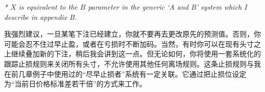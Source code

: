 \smallskip \noindent\textit{* \(X\) is equivalent to the \(B\) parameter in the generic ‘A and B’ system which I describe in appendix B.}

\begin{chinesetableblock} \begingroup \small \setlength{\tabcolsep}{2pt} \renewcommand{\arraystretch}{1.15}
\noindent{}
\endgroup \end{chinesetableblock}

\begin{chineseblock}我强烈建议，一旦某笔下注已经建立，你就不要再去更改原先的预测值。否则，你可能会忍不住过早止盈，或者在亏损时不断加码。当然，有时你可以在现有头寸之上继续叠加新的下注，稍后我会讲到这一点。但无论如何，你将使用一套系统化的跟踪止损规则来关闭所有头寸，不允许使用其他任何离场规则。这条止损规则与我在前几章例子中使用过的“尽早止损者”系统有一定关联。它通过把止损位设定为“当前日价格标准差若干倍”的方式来工作。\end{chineseblock}

